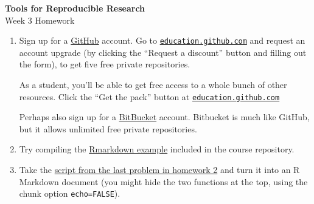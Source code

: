 \documentclass[12pt]{article}
\newcommand{\ttsm}{\tt \small}
\begin{document}
\thispagestyle{empty}

\textbf{Tools for Reproducible Research} \\
Week 3 Homework

\bigskip

\begin{enumerate}

\item Sign up for a \href{https://github.com}{GitHub} account. Go to
  \href{https://education.github.com}{\ttsm education.github.com} and
  request an account upgrade (by clicking the ``Request a discount''
  button and filling out the form), to get five free private repositories.

  As a student, you'll be able to get free access to a whole bunch of
  other resources. Click the ``Get the pack'' button at
  \href{https://education.github.com}{\ttsm education.github.com}

  Perhaps also sign up for a \href{http://bitbucket.org}{BitBucket}
  account. Bitbucket is much like GitHub, but it allows unlimited free
  private repositories.

\item Try compiling the
  \href{https://raw.githubusercontent.com/kbroman/Tools4RR/master/03_KnitrMarkdown/Examples/example1.Rmd}{Rmarkdown example}
  included in the course repository.


\item Take the
  \href{http://kbroman.org/Tools4RR/assets/homework/02_homework.R}{script from
    the last problem in homework 2}
  and turn it into an R Markdown document (you might hide the two
  functions at the top, using the chunk option {\tt echo=FALSE}).

\end{enumerate}
\end{document}
